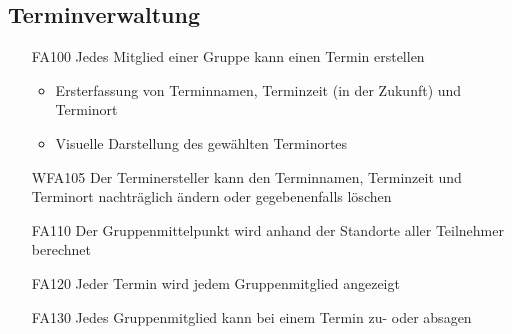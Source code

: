 \documentclass{scrartcl}
\begin{document}
	\subsection{Terminverwaltung}
	\begin{itemize}
	\hypertarget{FA100}{}
		\item[FA100] Jedes \gls{Mitglied} einer Gruppe kann einen Termin erstellen
		
		\begin{itemize}
			\item Ersterfassung von Terminnamen, Terminzeit (in der Zukunft) und Terminort
		\end{itemize}
		
		\begin{itemize}
			\item Visuelle Darstellung des gewählten Terminortes
		\end{itemize}
		\hypertarget{WFA105}{}
		\item[WFA105] Der Terminersteller kann den Terminnamen, Terminzeit und Terminort nachträglich ändern oder gegebenenfalls löschen
		\hypertarget{FA110}{}
		\item[FA110] Der Gruppenmittelpunkt wird anhand der Standorte aller \gls{Teilnehmer} berechnet		
		\hypertarget{FA120}{}
		\item[FA120] Jeder Termin wird jedem Gruppenmitglied angezeigt
		\hypertarget{FA130}{}
		\item[FA130] Jedes Gruppenmitglied kann bei einem Termin zu- oder absagen
		
	\end{itemize}
	
\end{document}
